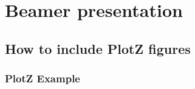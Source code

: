 \documentclass{beamer}
\begin{document}
\section{Beamer presentation}
\subsection{How to include PlotZ figures}

\begin{frame}
  \frametitle{PlotZ Example}
  \centering
\end{frame}
\end{document}
